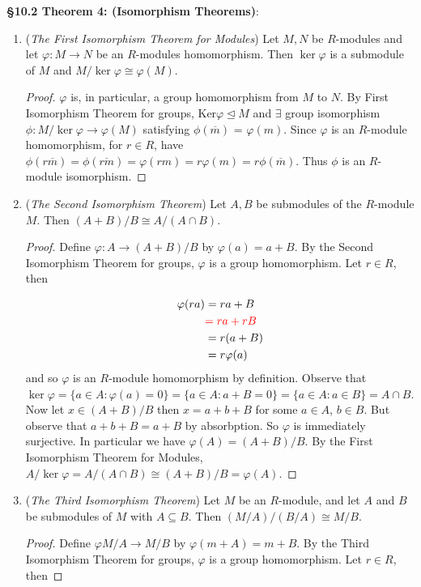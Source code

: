 \documentclass[8pt]{amsart}
\theoremstyle{plain}%
\theoremstyle{definition}
\theoremstyle{remark}
\numberwithin{equation}{section}
\begin{document}
\textbf{\S10.2 Theorem 4: (Isomorphism Theorems)}:
	\begin{enumerate}
		\item (\textit{The First Isomorphism Theorem for Modules}) Let $M, N$ be $R$-modules and let $\varphi : M \to N$ be an $R$-modules homomorphism. Then $\ker \varphi$ is a submodule of $M$ and $M/\ker \varphi \cong \varphi(M)$.
			\begin{proof}
				$\varphi$ is, in particular, a group homomorphism from $M$ to $N$. By First Isomorphism Theorem for groups, Ker$\varphi \trianglelefteq M$ and $\exists$ group isomorphism $\phi : M/\ker \varphi \to \varphi(M)$ satisfying $\phi(\overline{m})$ = $\varphi(m)$. Since $\varphi$ is an $R$-module homomorphism, for $r \in R$, have $\phi(r\overline{m}) = \phi(\overline{rm}) = \varphi(rm) = r\varphi(m) = r\phi(\overline{m})$. Thus $\phi$ is an $R$-module isomorphism.  
			\end{proof}
		\item (\textit{The Second Isomorphism Theorem}) Let $A, B$ be submodules of the $R$-module $M$. Then $(A + B)/B \cong A/(A \cap B)$.
			\begin{proof}
				Define $\varphi : A \to (A + B)/B$ by $\varphi(a) = a + B$. By the Second Isomorphism Theorem for groups, $\varphi$ is a group homomorphism. Let $r \in R$, then
				
				\begin{align*}
						\varphi(ra) &= ra + B\\
						&{\color{red} = ra + rB }\\
						&= r(a + B)\\
						&= r\varphi(a)
					\end{align*}
					and so $\varphi$ is an $R$-module homomorphism by definition. Observe that $\ker \varphi = \{a \in A : \varphi(a) = 0\} = \{a \in A : a + B = 0\} = \{a \in A : a \in B\} = A \cap B$. Now let $x \in (A + B)/B$ then $x = a + b + B$ for some $a \in A$, $b \in B$. But observe that $a + b + B = a + B$ by absorbption. So $\varphi$ is immediately surjective. In particular we have $\varphi(A) = (A + B)/B$. By the First Isomorphism Theorem for Modules, $A/\ker \varphi = A/(A \cap B) \cong (A + B)/B = \varphi(A)$.
			\end{proof}
		\item (\textit{The Third Isomorphism Theorem}) Let $M$ be an $R$-module, and let $A$ and $B$ be submodules of $M$ with $A \subseteq B$. Then $(M/A)/(B/A) \cong M/B$.
			\begin{proof}
				Define $\varphi M/A \to M/B$ by $\varphi(m + A) = m + B$. By the Third Isomorphism Theorem for groups, $\varphi$ is a group homomorphism. Let $r \in R$, then
				

\end{proof}
\end{enumerate}
\end{document}
